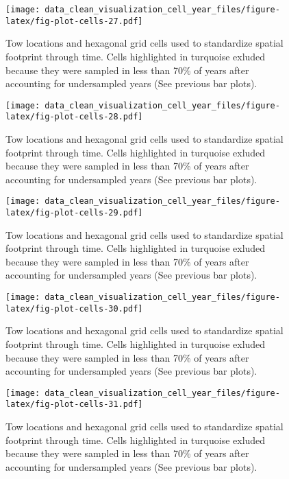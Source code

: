 \documentclass[
]{article}
\begin{document}
\begin{figure}
\centering
\texttt{[image: data\_clean\_visualization\_cell\_year\_files/figure-latex/fig-plot-cells-27.pdf]}
\caption{\label{fig:fig-plot-cells-27}Tow locations and hexagonal grid cells used to standardize spatial footprint through time. Cells highlighted in turquoise exluded because they were sampled in less than 70\% of years after accounting for undersampled years (See previous bar plots).}
\end{figure}

\begin{figure}
\centering
\texttt{[image: data\_clean\_visualization\_cell\_year\_files/figure-latex/fig-plot-cells-28.pdf]}
\caption{\label{fig:fig-plot-cells-28}Tow locations and hexagonal grid cells used to standardize spatial footprint through time. Cells highlighted in turquoise exluded because they were sampled in less than 70\% of years after accounting for undersampled years (See previous bar plots).}
\end{figure}

\begin{figure}
\centering
\texttt{[image: data\_clean\_visualization\_cell\_year\_files/figure-latex/fig-plot-cells-29.pdf]}
\caption{\label{fig:fig-plot-cells-29}Tow locations and hexagonal grid cells used to standardize spatial footprint through time. Cells highlighted in turquoise exluded because they were sampled in less than 70\% of years after accounting for undersampled years (See previous bar plots).}
\end{figure}

\begin{figure}
\centering
\texttt{[image: data\_clean\_visualization\_cell\_year\_files/figure-latex/fig-plot-cells-30.pdf]}
\caption{\label{fig:fig-plot-cells-30}Tow locations and hexagonal grid cells used to standardize spatial footprint through time. Cells highlighted in turquoise exluded because they were sampled in less than 70\% of years after accounting for undersampled years (See previous bar plots).}
\end{figure}

\begin{figure}
\centering
\texttt{[image: data\_clean\_visualization\_cell\_year\_files/figure-latex/fig-plot-cells-31.pdf]}
\caption{\label{fig:fig-plot-cells-31}Tow locations and hexagonal grid cells used to standardize spatial footprint through time. Cells highlighted in turquoise exluded because they were sampled in less than 70\% of years after accounting for undersampled years (See previous bar plots).}
\end{figure}
\end{document}
